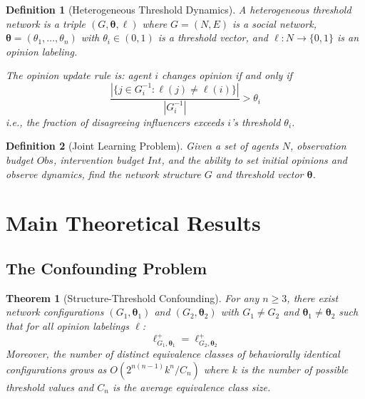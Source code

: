 \documentclass[11pt]{article}
\newtheorem{theorem}{Theorem}
\newtheorem{definition}{Definition}
\begin{document}
\begin{definition}[Heterogeneous Threshold Dynamics]
\label{def:heterogeneous_threshold}
A \emph{heterogeneous threshold network} is a triple $(G, \boldsymbol{\theta}, \ell)$ where $G = (N,E)$ is a social network, $\boldsymbol{\theta} = (\theta_1, \ldots, \theta_n)$ with $\theta_i \in (0,1)$ is a threshold vector, and $\ell : N \to \{0,1\}$ is an opinion labeling.

The \emph{opinion update rule} is: agent $i$ changes opinion if and only if
\[
\frac{|\{j \in G_i^{-1} : \ell(j) \neq \ell(i)\}|}{|G_i^{-1}|} > \theta_i
\]
i.e., the fraction of disagreeing influencers exceeds $i$'s threshold $\theta_i$.
\end{definition}

\begin{definition}[Joint Learning Problem]
Given a set of agents $N$, observation budget $Obs$, intervention budget $Int$, and the ability to set initial opinions and observe dynamics, find the network structure $G$ and threshold vector $\boldsymbol{\theta}$.
\end{definition}

\section{Main Theoretical Results}
\label{sec:theory}

\subsection{The Confounding Problem}

\begin{theorem}[Structure-Threshold Confounding]
\label{thm:threshold_confounding}
For any $n \geq 3$, there exist network configurations $(G_1, \boldsymbol{\theta}_1)$ and $(G_2, \boldsymbol{\theta}_2)$ with $G_1 \neq G_2$ and $\boldsymbol{\theta}_1 \neq \boldsymbol{\theta}_2$ such that for all opinion labelings $\ell$:
\[
\ell^+_{G_1, \boldsymbol{\theta}_1} = \ell^+_{G_2, \boldsymbol{\theta}_2}
\]
Moreover, the number of distinct equivalence classes of behaviorally identical configurations grows as $O(2^{n(n-1)} k^n / C_n)$ where $k$ is the number of possible threshold values and $C_n$ is the average equivalence class size.
\end{theorem}
\end{document}
